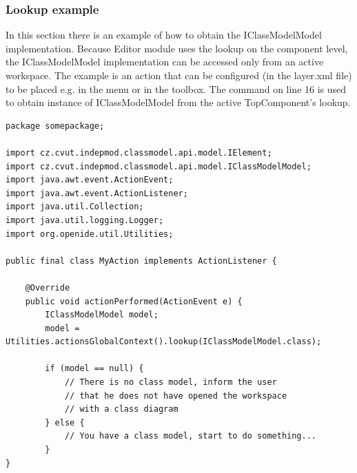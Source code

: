 \subsubsection{Lookup example}

In this section there is an example of how to obtain the IClassModelModel implementation. Because Editor module uses the lookup on the component level, the IClassModelModel implementation can be accessed only from an active workspace. The example is an action that can be configured (in the layer.xml file) to be placed e.g. in the menu or in the toolbox. The command on line 16 is used to obtain instance of IClassModelModel from the active TopComponent's lookup.

\begin{lstlisting}
package somepackage;

import cz.cvut.indepmod.classmodel.api.model.IElement;
import cz.cvut.indepmod.classmodel.api.model.IClassModelModel;
import java.awt.event.ActionEvent;
import java.awt.event.ActionListener;
import java.util.Collection;
import java.util.logging.Logger;
import org.openide.util.Utilities;

public final class MyAction implements ActionListener {

    @Override
    public void actionPerformed(ActionEvent e) {
        IClassModelModel model;
        model = Utilities.actionsGlobalContext().lookup(IClassModelModel.class);

        if (model == null) {
            // There is no class model, inform the user 
            // that he does not have opened the workspace
            // with a class diagram
        } else {
            // You have a class model, start to do something...
        }
}
\end{lstlisting}
